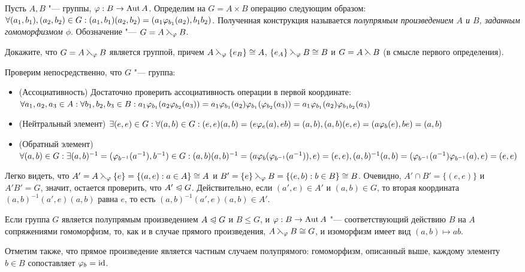 \begin{definition}
	Пусть $A, B$ "--- группы, $\varphi: B \to \operatorname{Aut}{A}$. Определим на $G = A \times B$ операцию следующим образом: $\forall (a_1, b_1), (a_2, b_2) \hm\in G: (a_1, b_1)(a_2, b_2) = (a_1\phi_{b_1}(a_2), b_1b_2)$. Полученная конструкция называется \textit{полупрямым произведением $A$ и $B$, заданным гомоморфизмом $\phi$}. Обозначение "--- $G = A \leftthreetimes_{\varphi} B$.
\end{definition}

\begin{exercise}
	Докажите, что $G = A \leftthreetimes_{\varphi} B$ является группой, причем $A \sd_\phi \{e_B\} \hm\cong A$, $\{e_A\} \leftthreetimes_{\varphi} B \cong B$ и $G = A \leftthreetimes B$ (в смысле первого определения).
\end{exercise}

\begin{solution}
	Проверим непосредственно, что $G$ "--- группа:
	\begin{itemize}
		\item (Ассоциативность) Достаточно проверить ассоциативность операции в первой координате: $\forall a_1, a_2, a_3 \in A: \forall b_1, b_2, b_3 \in B: a_1\phi_{b_1}(a_2\phi_{b_2}(a_3)) = a_1\phi_{b_1}(a_2)\phi_{b_1}(\phi_{b_2}(a_3)) \hm= a_1\phi_{b_1}(a_2)\phi_{b_1b_2}(a_3)$
		\item (Нейтральный элемент) $\exists (e, e) \in G: \forall (a, b) \in G: (e, e)(a, b) \hm= (e\phi_e(a), eb) \hm= (a, b), (a, b)(e, e) = (a\phi_b(e), be) = (a, b)$
		\item (Обратный элемент) $\forall (a, b) \in G: \exists (a, b)^{-1} = (\phi_{b^{-1}}(a^{-1}), b^{-1}) \hm\in G: (a, b)(a, b)^{-1} \hm= (a\phi_b(\phi_{b^{-1}}(a^{-1})), e) = (e, e), (a, b)^{-1}(a, b) \hm= (\phi_{b^{-1}}(a^{-1})\phi_{b^{-1}}(a), e) = (e, e)$
	\end{itemize}
	
	Легко видеть, что $A' = A \leftthreetimes_{\varphi} \{e\} = \{(a, e): a \in A\} \cong A$ и $B' \hm= \{e\} \sd_\phi B \hm = \{(e, b): b \hm\in B\} \cong B$. Очевидно, $A' \cap B' = \{(e, e)\}$ и $A'B' = G$, значит, остается проверить, что $A' \trianglelefteqslant G$. Действительно, если $(a', e) \in A'$ и $(a, b) \in G$, то вторая координата $(a, b)^{-1}(a', e)(a, b)$ равна $e$, то есть $(a, b)^{-1}(a', e)(a, b) \in A'$.
\end{solution}

\begin{note}
	Если группа $G$ является полупрямым произведением $A \trianglelefteqslant G$ и $B \le G$, и $\varphi: B \to \operatorname{Aut}{A}$ "--- соответствующий действию $B$ на $A$ сопряжениями гомоморфизм, то, как и в случае прямого произведения, $A \leftthreetimes_{\varphi} B \cong G$, и изоморфизм имеет вид $(a, b) \mapsto ab$.
	
	Отметим также, что прямое произведение является частным случаем полупрямого: гомоморфизм, описанный выше, каждому элементу $b \in B$ сопоставляет $\varphi_b = \operatorname{id}$.
\end{note}